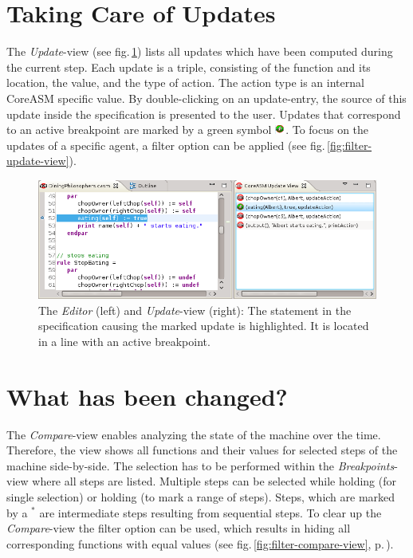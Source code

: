 \documentclass[10pt,oneside,a4paper]{article}
\begin{document}
\section{Taking Care of Updates}
The \emph{Update}-view (see fig.\,\ref{fig:update-view-and-source}) lists all updates which have been computed during the current step. Each update is a triple, consisting of the function and its location, the value, and the type of action. The action type is an internal CoreASM specific value. By double-clicking on an update-entry, the source of this update inside the specification is presented to the user. Updates that correspond to an active breakpoint are marked by a green symbol \includegraphics[height=0.8em]{images/breakpoint-update.png}. To focus on the updates of a specific agent, a filter option can be applied (see fig.\,\ref{fig:filter-update-view}).

\begin{figure}[h]
	\centering
	\includegraphics[scale=0.65]{images/update-view-with-source.png}
	\caption{The \emph{Editor} (left) and \emph{Update}-view (right): The statement in the specification causing the marked update is highlighted. It is located in a line with an active breakpoint.}
	\label{fig:update-view-and-source}
\end{figure}

\section{What has been changed?}
The \emph{Compare}-view enables analyzing the state of the machine over the time. Therefore, the view shows all functions and their values for selected steps of the machine side-by-side. The selection has to be performed within the \emph{Breakpoints}-view where all steps are listed. Multiple steps can be selected while holding \keys{\ctrl} (for single selection) or holding \keys{\shift} (to mark a range of steps). Steps, which are marked by a $^*$ are intermediate steps resulting from sequential steps. To clear up the \emph{Compare}-view the filter option can be used, which results in hiding all corresponding functions with equal values (see fig.\,\ref{fig:filter-compare-view}, p.\,\pageref{fig:filter-compare-view}).
\end{document}
